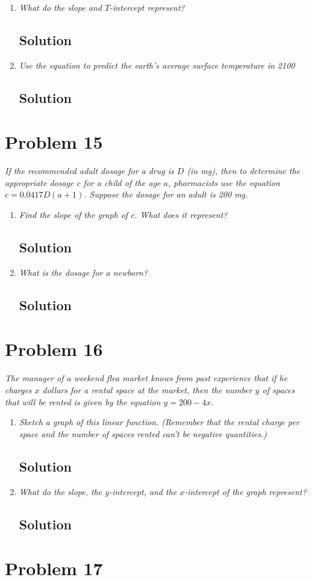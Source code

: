 \documentclass[11pt]{article}
\newcommand{\soln}{\subsection*}
\newcommand{\qn}{\textit}
\begin{document}
\begin{enumerate}
	\item \qn{What do the slope and $T$-intercept represent?}
	\soln{Solution}
	
	\item \qn{Use the equation to predict the earth's average surface temperature in 2100}
	\soln{Solution}
\end{enumerate}

\section*{Problem 15}

\qn{If the recommended adult dosage for a drug is $D$ (in mg), then to determine the appropriate dosage $c$ for a child of the age $a$, pharmacists use the equation $c=0.0417D(a+1)$. Suppose the dosage for an adult is 200 mg.}

\begin{enumerate}
	\item \qn{Find the slope of the graph of $c$. What does it represent?}
	\soln{Solution}
	
	\item \qn{What is the dosage for a newborn?}
	\soln{Solution}
\end{enumerate}

\section*{Problem 16}

\qn{The manager of a weekend flea market knows from past experience that if he charges $x$ dollars for a rental space at the market, then the number $y$ of spaces that will be rented is given by the equation $y=200-4x$.}

\begin{enumerate}
	\item \qn{Sketch a graph of this linear function. (Remember that the rental charge per space and the number of spaces rented can't be negative quantities.)}
	\soln{Solution}
	
	\item \qn{What do the slope, the $y$-intercept, and the $x$-intercept of the graph represent?}
	\soln{Solution}
\end{enumerate}

\section*{Problem 17}
\end{document}
